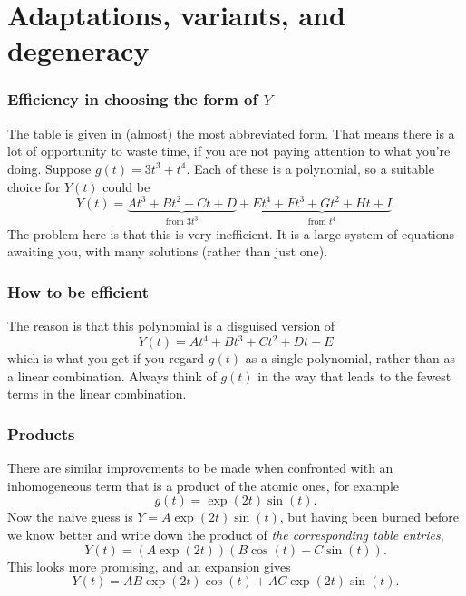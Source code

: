 \section{Adaptations, variants, and degeneracy}
\label{adaptationsvariantsanddegeneracy}

\begin{frame}

\frametitle{Efficiency in choosing the form of $ Y $}
\label{efficiencyinchoosingtheformofy}

The table is given in (almost) the most abbreviated form. That means there is a lot of opportunity to waste time, if you are not paying attention to what you're doing. Suppose $ g(t) = 3t^3 + t^4 $. Each of these is a polynomial, so a suitable choice for $ Y(t) $ could be
\[
    Y(t) = \underbrace{At^3 + Bt^2 + Ct + D}_{\text{from $3t^3$}} + \underbrace{Et^4 + Ft^3 + Gt^2 + Ht + I}_{\text{from $t^4$}}.
\]
The problem here is that this is very inefficient. It is a large system of equations awaiting you, with many solutions (rather than just one). 

\end{frame}

\begin{frame}

\frametitle{How to be efficient}
\label{howtobeefficient}

The reason is that this polynomial is a disguised version of
\[
    Y(t) = At^4 + Bt^3 + Ct^2 + Dt + E
\]
which is what you get if you regard $ g(t) $ as a single polynomial, rather than as a linear combination. Always think of $ g(t) $ in the way that leads to the fewest terms in the linear combination.

\end{frame}

\begin{frame}

\frametitle{Products}
\label{products}

There are similar improvements to be made when confronted with an inhomogeneous term that is a product of the atomic ones, for example
\[
    g(t) = \exp{(2t)} \sin{(t)}.
\]
Now the na\"ive guess is $ Y = A \exp{(2t)} \sin{(t)} $, but having been burned before we know better and write down the product of \emph{the corresponding table entries},
\[
    Y(t) = (A \exp{(2t)}) (B \cos{(t)} + C \sin{(t)}).
\]
This looks more promising, and an expansion gives
\[
    Y(t) = AB \exp{(2t)} \cos{(t)} + AC \exp{(2t)} \sin{(t)}.
\]

\end{frame}

